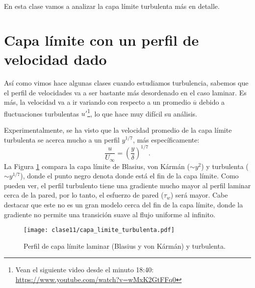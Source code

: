En esta clase vamos a analizar la capa límite turbulenta más en detalle.

\section*{Capa límite con un perfil de velocidad dado}

Así como vimos hace algunas clases cuando estudiamos turbulencia, sabemos que el perfil de velocidades va a ser bastante más desordenado en el caso laminar.
Es más, la velocidad va a ir variando con respecto a un promedio $\overline{u}$ debido a fluctuaciones turbulentas $u'$\footnote{Vean el siguiente video desde el minuto 18:40: \url{https://www.youtube.com/watch?v=wMxK2GtFFq0}}, lo que hace muy difícil su análisis.

Experimentalmente, se ha visto que la velocidad promedio de la capa límite turbulenta se acerca mucho a un perfil $y^{1/7}$, más específicamente:
%
\begin{equation}\label{eq:perfil_turbulento}
\frac{u}{U_\infty} = \left(\frac{y}{\delta}\right)^{1/7}.
\end{equation}
%
La Figura \ref{fig:capa_limite_turbulenta} compara la capa límite de Blasius, von Kármán ($\sim y^2$) y turbulenta ($\sim y^{1/7}$), donde el punto negro denota donde está el fin de la capa límite. Como pueden ver, el perfil turbulento tiene una gradiente mucho mayor al perfil laminar cerca de la pared, por lo tanto, el esfuerzo de pared ($\tau_w$) será mayor.
Cabe destacar que este no es un gran modelo cerca del fin de la capa límite, donde la gradiente no permite una transición suave al flujo uniforme al infinito.
%
\begin{figure}
\centering
\texttt{[image: clase11/capa\_limite\_turbulenta.pdf]}
\caption{Perfil de capa límite laminar (Blasius y von Kármán) y turbulenta.}
\label{fig:capa_limite_turbulenta}
\end{figure}

